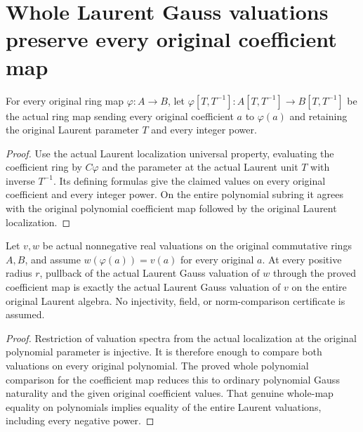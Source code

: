 \section{Whole Laurent Gauss valuations preserve every original coefficient map}

\begin{definition}\label{def:laurent-coefficient-hom}
\leanok
{}
For every original ring map $\varphi:A\to B$, let
$\varphi[T,T^{-1}]:A[T,T^{-1}]\to B[T,T^{-1}]$ be the actual ring map
sending every original coefficient $a$ to $\varphi(a)$ and retaining the
original Laurent parameter $T$ and every integer power.
\end{definition}
\begin{proof}
Use the actual Laurent localization universal property, evaluating the
coefficient ring by $C\varphi$ and the parameter at the actual Laurent
unit $T$ with inverse $T^{-1}$. Its defining formulas give the claimed
values on every original coefficient and every integer power. On the
entire polynomial subring it agrees with the original polynomial
coefficient map followed by the original Laurent localization.
\end{proof}

\begin{theorem}\label{thm:laurent-gauss-coefficient-naturality}
\leanok
{}
Let $v,w$ be actual nonnegative real valuations on the original commutative
rings $A,B$, and assume $w(\varphi(a))=v(a)$ for every original $a$.
At every positive radius $r$, pullback of the actual Laurent Gauss
valuation of $w$ through the proved coefficient map is exactly the actual
Laurent Gauss valuation of $v$ on the entire original Laurent algebra.
No injectivity, field, or norm-comparison certificate is assumed.
\end{theorem}
\begin{proof}
Restriction of valuation spectra from the actual localization at the
original polynomial parameter is injective. It is therefore enough to
compare both valuations on every original polynomial. The proved whole
polynomial comparison for the coefficient map reduces this to ordinary
polynomial Gauss naturality and the given original coefficient values.
That genuine whole-map equality on polynomials implies equality of the
entire Laurent valuations, including every negative power.
\end{proof}

